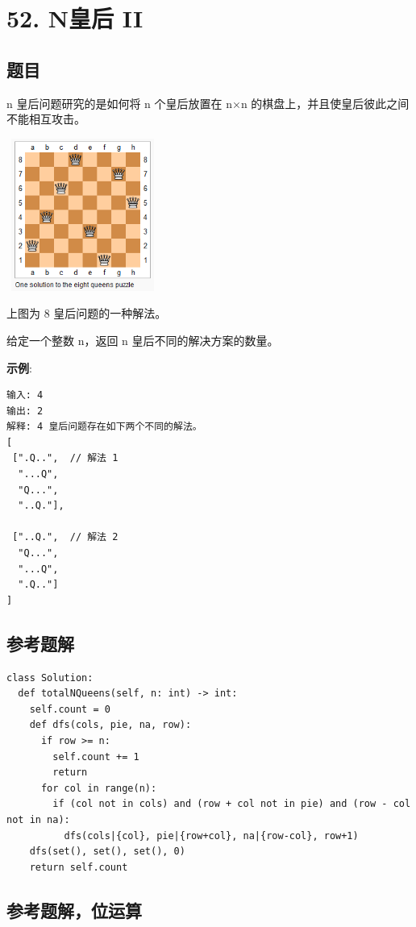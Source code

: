 \newpage
\section{52. N皇后 II}
\label{leetcode:52}

\subsection{题目}

n 皇后问题研究的是如何将 n 个皇后放置在 n×n 的棋盘上，并且使皇后彼此之间不能相互攻击。

\includegraphics[width=50mm,height=50mm]{images/leetcode/8-queens.png}

上图为 8 皇后问题的一种解法。

给定一个整数 n，返回 n 皇后不同的解决方案的数量。

\textbf{示例}:

\begin{verbatim}
输入: 4
输出: 2
解释: 4 皇后问题存在如下两个不同的解法。
[
 [".Q..",  // 解法 1
  "...Q",
  "Q...",
  "..Q."],

 ["..Q.",  // 解法 2
  "Q...",
  "...Q",
  ".Q.."]
]
\end{verbatim}

\subsection{参考题解}

\begin{verbatim}
class Solution:
  def totalNQueens(self, n: int) -> int:
    self.count = 0
    def dfs(cols, pie, na, row):
      if row >= n:
        self.count += 1
        return
      for col in range(n):
        if (col not in cols) and (row + col not in pie) and (row - col not in na):
          dfs(cols|{col}, pie|{row+col}, na|{row-col}, row+1)
    dfs(set(), set(), set(), 0)
    return self.count
\end{verbatim}

\subsection{参考题解，位运算}

